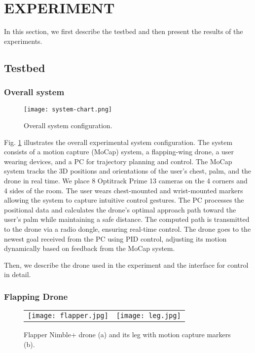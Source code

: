 \section{EXPERIMENT}
In this section, we first describe the testbed and then present the results of the experiments.

\subsection{Testbed}

\subsubsection{Overall system}

\begin{figure}
  \centering
  \texttt{[image: system-chart.png]}
  \caption{Overall system configuration.}
  \label{fig:system}
\end{figure}
Fig. \ref{fig:system} illustrates the overall experimental system configuration.
The system consists of a motion capture (MoCap) system, a flapping-wing drone, a user wearing devices, and a PC for trajectory planning and control.
The MoCap system tracks the 3D positions and orientations of the user's chest, palm, and the drone in real time.
We place 8 Optitrack Prime 13 cameras on the 4 corners and 4 sides of the room.  
The user wears chest-mounted and wrist-mounted markers allowing the system to capture intuitive control gestures. 
The PC processes the positional data and calculates the drone's optimal approach path toward the user's palm while maintaining a safe distance. 
The computed path is transmitted to the drone via a radio dongle, ensuring real-time control. 
The drone goes to the newest goal received from the PC using PID control, adjusting its motion dynamically based on feedback from the MoCap system.

Then, we describe the drone used in the experiment and the interface for control in detail.

\subsubsection{Flapping Drone}

\begin{figure}
    \centering
    \begin{tabular}{cc}
        \begin{minipage}[h]{0.4 \columnwidth}
          \centering
          \texttt{[image: flapper.jpg]}
          \subcaption{}
          \label{fig:flapper}
        \end{minipage} &
        \begin{minipage}[h]{0.4 \columnwidth}
          \centering
          \texttt{[image: leg.jpg]}
          \subcaption{}
          \label{fig:leg}
        \end{minipage}
      \end{tabular}
    \caption{Flapper Nimble+ drone (a) and its leg with motion capture markers (b).}
\end{figure}

